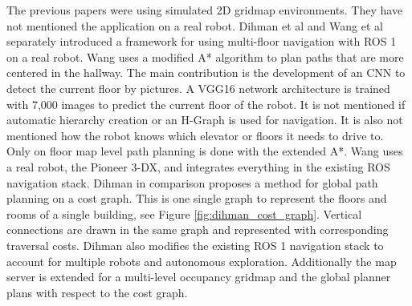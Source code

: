 The previous papers were using simulated 2D gridmap environments. They have not mentioned the application on a real robot. Dihman et al \cite{dhiman_ros_2020} and Wang et al \cite{wang_autonomous_2019} separately introduced a framework for using multi-floor navigation with ROS 1 on a real robot. Wang uses a modified A* algorithm to plan paths that are more centered in the hallway. The main contribution is the development of an CNN to detect the current floor by pictures. A VGG16 network architecture is trained with 7,000 images to predict the current floor of the robot. It is not mentioned if automatic hierarchy creation or an H-Graph is used for navigation. It is also not mentioned how the robot knows which elevator or floors it needs to drive to. Only on floor map level path planning is done with the extended A*. Wang uses a real robot, the Pioneer 3-DX, and integrates everything in the existing ROS navigation stack. Dihman in comparison proposes a method for global path planning on a cost graph. This is one single graph to represent the floors and rooms of a single building, see Figure \ref{fig:dihman_cost_graph}. Vertical connections are drawn in the same graph and represented with corresponding traversal costs. Dihman also modifies the existing ROS 1 navigation stack to account for multiple robots and autonomous exploration. Additionally the map server is extended for a multi-level occupancy gridmap and the global planner plans with respect to the cost graph.

